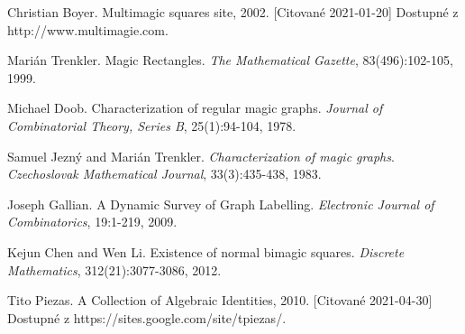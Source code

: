 \documentclass[12pt, twoside]{book}
\begin{document}
\begin{thebibliography}{7}
 Christian Boyer. Multimagic squares site, 2002. [Citované 2021-01-20] Dostupné z http://www.multimagie.com.

 Marián Trenkler. Magic Rectangles. \textit{The Mathematical Gazette}, 83(496):102-105, 1999.

 Michael Doob. Characterization of regular magic graphs. \textit{Journal of Combinatorial Theory, Series B}, 25(1):94-104, 1978.

 Samuel Jezný and Marián Trenkler. \textit{Characterization of magic graphs}. \textit{Czechoslovak Mathematical Journal}, 33(3):435-438, 1983.

 Joseph Gallian. A Dynamic Survey of Graph Labelling. \textit{Electronic Journal of Combinatorics}, 19:1-219, 2009.

 Kejun Chen and Wen Li. Existence of normal bimagic squares. \textit{Discrete Mathematics}, 312(21):3077-3086, 2012.

 Tito Piezas. A Collection of Algebraic Identities, 2010. [Citované 2021-04-30] Dostupné z https://sites.google.com/site/tpiezas/.

\end{thebibliography}



%
%

%
\end{document}
